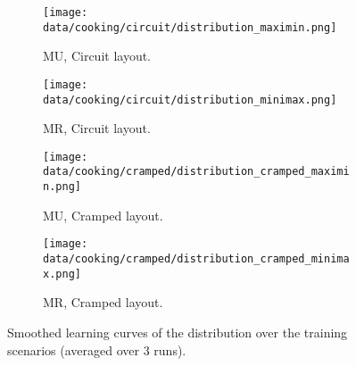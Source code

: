 \begin{figure}
    \centering
    \begin{subfigure}[t]{0.48\linewidth}
    \texttt{[image: data/cooking/circuit/distribution\_maximin.png]}
    \caption{MU, Circuit layout.}
    \end{subfigure}
    \begin{subfigure}[t]{0.48\linewidth}
    \texttt{[image: data/cooking/circuit/distribution\_minimax.png]}
    \caption{MR, Circuit layout.}
    \end{subfigure}
        \begin{subfigure}[t]{0.48\linewidth}
    \texttt{[image: data/cooking/cramped/distribution\_cramped\_maximin.png]}
    \caption{MU, Cramped layout.}
    \end{subfigure}
    \begin{subfigure}[t]{0.48\linewidth}
    \texttt{[image: data/cooking/cramped/distribution\_cramped\_minimax.png]}
    \caption{MR, Cramped layout.}
    \end{subfigure}
    \caption{Smoothed learning curves of the distribution over the training scenarios (averaged over 3 runs).}
    \label{fig:cooking.learning_curves_prior}
\end{figure}